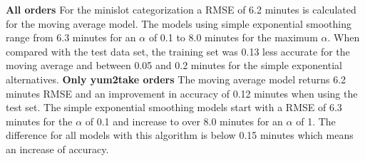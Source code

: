 \newline\newline\textbf{All orders}\newline
For the minislot categorization a RMSE of 6.2 minutes is calculated for the moving average model. The models using simple exponential smoothing range from 6.3 minutes for an $\alpha$ of 0.1 to 8.0 minutes for the maximum $\alpha$. When compared with the test data set, the training set was 0.13 less accurate for the moving average and between 0.05 and 0.2 minutes for the simple exponential alternatives.
\newline\newline\textbf{Only yum2take orders}\newline
The moving average model returns 6.2 minutes RMSE and an improvement in accuracy of 0.12 minutes when using the test set. The simple exponential smoothing models start with a RMSE of 6.3 minutes for the $\alpha$ of 0.1 and increase to over 8.0 minutes for an $\alpha$ of 1. The difference for all models with this algorithm is below 0.15 minutes which means an increase of accuracy.
